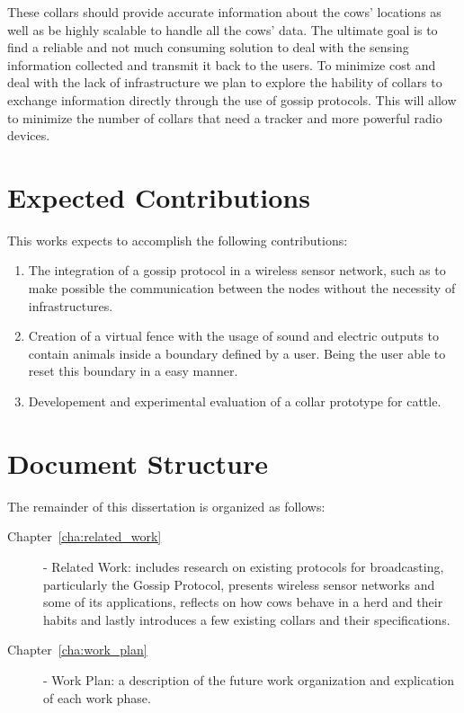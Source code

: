 These collars should provide accurate information about the cows' locations as well as be
highly scalable to handle all the cows' data. The ultimate goal is to find a reliable and
not much consuming solution to deal with the sensing information collected and transmit it
back to the users. To minimize cost and deal with the lack of infrastructure we plan to explore
the hability of collars to exchange information directly through the use of gossip protocols.
This will allow to minimize the number of collars that need a  tracker and
more powerful radio devices.

\section{Expected Contributions}
\label{sec:expected_contributions}
This works expects to accomplish the following contributions:
\begin{enumerate}
      \item The integration of a gossip protocol in a wireless sensor network, such as to make
            possible the communication between the nodes without the necessity of infrastructures.
      \item Creation of a virtual fence with the usage of sound and electric outputs to contain
            animals inside a boundary defined by a user. Being the user able to reset this
            boundary in a easy manner.
      \item Developement and experimental evaluation of a collar prototype for cattle.
\end{enumerate}

\section{Document Structure}
\label{sec:structure}
The remainder of this dissertation is organized as follows:
\begin{description}
      \item[Chapter~\ref{cha:related_work}] - Related Work: includes research on existing
            protocols for broadcasting, particularly the Gossip Protocol, presents wireless
            sensor networks and some of its applications, reflects on how cows behave in a
            herd and their habits and lastly introduces a few existing collars and their
            specifications.
      \item[Chapter~\ref{cha:work_plan}] - Work Plan: a description of the future work
            organization and explication of each work phase.
\end{description}
